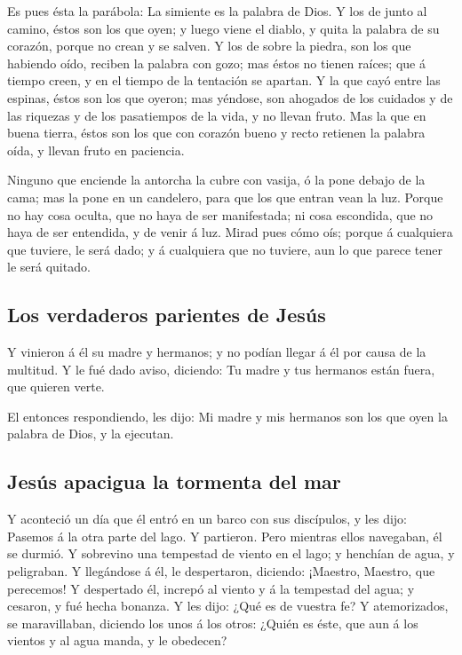  Es pues ésta la parábola: La simiente es la palabra de
Dios.  Y los de junto al camino, éstos son los que oyen;
y luego viene el diablo, y quita la palabra de su corazón, porque no
crean y se salven.  Y los de sobre la piedra, son los que
habiendo oído, reciben la palabra con gozo; mas éstos no tienen raíces;
que á tiempo creen, y en el tiempo de la tentación se apartan.
 Y la que cayó entre las espinas, éstos son los que
oyeron; mas yéndose, son ahogados de los cuidados y de las riquezas y de
los pasatiempos de la vida, y no llevan fruto.  Mas la
que en buena tierra, éstos son los que con corazón bueno y recto
retienen la palabra oída, y llevan fruto en paciencia.

 Ninguno que enciende la antorcha la cubre con vasija, ó
la pone debajo de la cama; mas la pone en un candelero, para que los que
entran vean la luz.  Porque no hay cosa oculta, que no
haya de ser manifestada; ni cosa escondida, que no haya de ser
entendida, y de venir á luz.  Mirad pues cómo oís; porque
á cualquiera que tuviere, le será dado; y á cualquiera que no tuviere,
aun lo que parece tener le será quitado.

\hypertarget{los-verdaderos-parientes-de-jesuxfas}{%
\subsection{Los verdaderos parientes de
Jesús}\label{los-verdaderos-parientes-de-jesuxfas}}

 Y vinieron á él su madre y hermanos; y no podían llegar
á él por causa de la multitud.  Y le fué dado aviso,
diciendo: Tu madre y tus hermanos están fuera, que quieren verte.

 El entonces respondiendo, les dijo: Mi madre y mis
hermanos son los que oyen la palabra de Dios, y la ejecutan.

\hypertarget{jesuxfas-apacigua-la-tormenta-del-mar}{%
\subsection{Jesús apacigua la tormenta del
mar}\label{jesuxfas-apacigua-la-tormenta-del-mar}}

 Y aconteció un día que él entró en un barco con sus
discípulos, y les dijo: Pasemos á la otra parte del lago. Y partieron.
 Pero mientras ellos navegaban, él se durmió. Y sobrevino
una tempestad de viento en el lago; y henchían de agua, y peligraban.
 Y llegándose á él, le despertaron, diciendo: ¡Maestro,
Maestro, que perecemos! Y despertado él, increpó al viento y á la
tempestad del agua; y cesaron, y fué hecha bonanza.  Y
les dijo: ¿Qué es de vuestra fe? Y atemorizados, se maravillaban,
diciendo los unos á los otros: ¿Quién es éste, que aun á los vientos y
al agua manda, y le obedecen?

